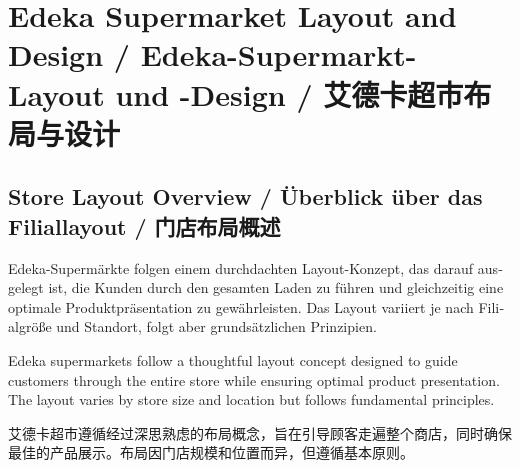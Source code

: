 \chapter{Edeka Supermarket Layout and Design / Edeka-Supermarkt-Layout und -Design / 艾德卡超市布局与设计}

\section{Store Layout Overview / Überblick über das Filiallayout / 门店布局概述}

\begin{otherlanguage}{ngerman}
Edeka-Supermärkte folgen einem durchdachten Layout-Konzept, das darauf ausgelegt ist, die Kunden durch den gesamten Laden zu führen und gleichzeitig eine optimale Produktpräsentation zu gewährleisten. Das Layout variiert je nach Filialgröße und Standort, folgt aber grundsätzlichen Prinzipien.
\end{otherlanguage}

Edeka supermarkets follow a thoughtful layout concept designed to guide customers through the entire store while ensuring optimal product presentation. The layout varies by store size and location but follows fundamental principles.

艾德卡超市遵循经过深思熟虑的布局概念，旨在引导顾客走遍整个商店，同时确保最佳的产品展示。布局因门店规模和位置而异，但遵循基本原则。

